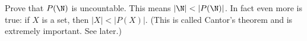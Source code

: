   Prove that $P(\N)$ is uncountable.
  This means $|\N| < |P(\N)|$.
  In fact even more is true:
  if $X$ is a set, then $|X| < |P(X)|$.
  (This is called Cantor's theorem and is extremely important.
  See later.)
